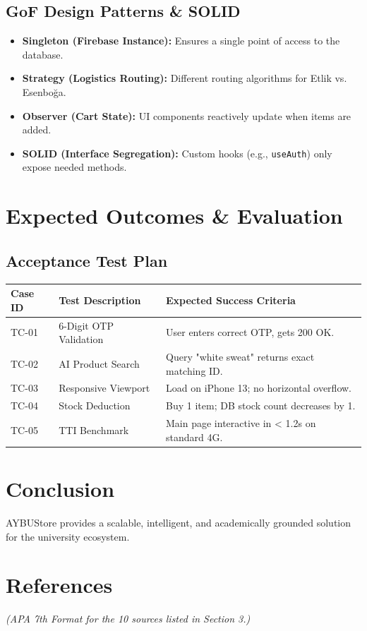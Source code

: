 \documentclass[11pt,a4paper]{article}
\begin{document}
\subsection{GoF Design Patterns \& SOLID}
\begin{itemize}
    \item \textbf{Singleton (Firebase Instance):} Ensures a single point of access to the database.
    \item \textbf{Strategy (Logistics Routing):} Different routing algorithms for Etlik vs. Esenboğa.
    \item \textbf{Observer (Cart State):} UI components reactively update when items are added.
    \item \textbf{SOLID (Interface Segregation):} Custom hooks (e.g., \texttt{useAuth}) only expose needed methods.
\end{itemize}

\section{Expected Outcomes \& Evaluation}
\subsection{Acceptance Test Plan}
\begin{table}[h!]
\centering
\begin{tabularx}{\textwidth}{l|X|X}
\toprule
\textbf{Case ID} & \textbf{Test Description} & \textbf{Expected Success Criteria} \\ \midrule
TC-01 & 6-Digit OTP Validation & User enters correct OTP, gets 200 OK. \\
TC-02 & AI Product Search & Query "white sweat" returns exact matching ID. \\
TC-03 & Responsive Viewport & Load on iPhone 13; no horizontal overflow. \\
TC-04 & Stock Deduction & Buy 1 item; DB stock count decreases by 1. \\
TC-05 & TTI Benchmark & Main page interactive in < 1.2s on standard 4G. \\ \bottomrule
\end{tabularx}
\end{table}

\section{Conclusion}
AYBUStore provides a scalable, intelligent, and academically grounded solution for the university ecosystem.

\section{References}
\textit{(APA 7th Format for the 10 sources listed in Section 3.)}
\end{document}
